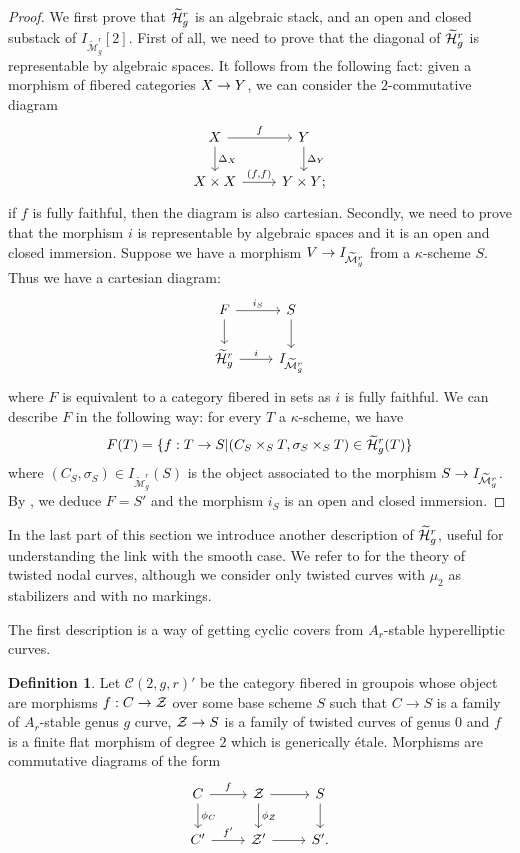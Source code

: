 \documentclass{alggeom}
\numberwithin{equation}{section}
\numberwithin{subsection}{section}
\theoremstyle{definition}
\newtheorem{definition}[theorem]{Definition}
\theoremstyle{remark}
\newcommand\cC{\mathcal{C}} \newcommand\cD{\mathcal{D}}
\newcommand\arr{\ifinner\to\else\longrightarrow\fi}
\newcommand{\Mtilde}{\widetilde{\mathcal M}}
\newcommand{\Htilde}{\widetilde{\cH}}
\begin{document}
\begin{proof}
We first prove that $\Htilde_g^r$ is an algebraic stack, and an open and closed substack of $\mathit{I}_{\Mtilde_g^r}[2]$.
First of all, we need to prove that the diagonal of $\Htilde_g^r$ is representable by algebraic spaces. It follows from the following fact: given a morphism of fibered categories $X\arr Y$, we can consider the $2$-commutative diagram
$$
\begin{tikzcd}
X \arrow[d, "\Delta_X"] \arrow[r, "f"] & Y \arrow[d, "\Delta_Y"] \\
X\times X \arrow[r, "{(f,f)}"]       & Y\times Y;            
\end{tikzcd}
$$
 if $f$ is fully faithful, then the diagram is also cartesian.
Secondly, we need to prove that the morphism $i$ is representable by algebraic spaces and it is an open and closed immersion. Suppose we have a morphism $ V\arr \mathit{I}_{\Mtilde_g^r}$ from a $\kappa$-scheme $S$. Thus we have a cartesian diagram:
 $$
 \begin{tikzcd}
 F \arrow[d] \arrow[r, "i_S"] & S \arrow[d]              \\
 \Htilde_g^r \arrow[r, "i"]   & \mathit{I}_{\Mtilde_g^r}
 \end{tikzcd}
 $$
 where $F$ is equivalent to a category fibered in sets as $i$ is fully faithful. We can describe $F$ in the following way: for every $T$ a $\kappa$-scheme, we have $$F(T)=\{ f:T\arr S |(C_S\times_S T,\sigma_S \times_S T) \in \Htilde_g^r(T) \}$$
 where $(C_S,\sigma_S) \in \mathit{I}_{\Mtilde_g^r}(S)$ is the object associated to the morphism $S\arr   \mathit{I}_{\Mtilde_g^r}$. By , we deduce $F=S'$ and the morphism $i_S$ is an open and closed immersion.
\end{proof}

In the last part of this section we introduce another description of $\Htilde_g^r$, useful for understanding the link with the smooth case. We refer to \cite{AbOlVis} for the theory of twisted nodal curves, although we consider only twisted curves with $\mu_2$ as stabilizers and with no markings. 

The first description is a way of getting cyclic covers from $A_r$-stable hyperelliptic curves. 

\begin{definition}
	Let $\cC(2,g,r)'$ be the category fibered in groupois whose object are morphisms $f:C\rightarrow \mathcal{Z}$ over some base scheme $S$ such that $C\rightarrow S$ is a family of $A_r$-stable genus $g$ curve, $\mathcal{Z}\rightarrow S$ is a family of twisted curves of genus $0$ and $f$ is a finite flat morphism of degree $2$ which is generically \'etale. Morphisms are commutative diagrams of the form
	$$
	\begin{tikzcd}
	C \arrow[d, "\phi_C"] \arrow[r, "f"] & \cZ \arrow[d, "\phi_Z"] \arrow[r] & S \arrow[d] \\
	C' \arrow[r, "f'"]                   & \cZ' \arrow[r]                    & S'.         
	\end{tikzcd}
	$$
\end{definition}
\end{document}
